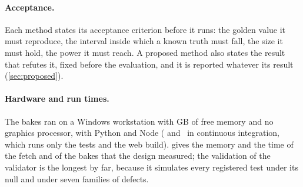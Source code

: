 \paragraph{Acceptance.} Each method states its acceptance criterion before it runs: the golden value it must reproduce, the interval inside which a known truth must fall, the size it must hold, the power it must reach. A proposed method also states the result that refutes it, fixed before the evaluation, and it is reported whatever its result (\cref{sec:proposed}).

\paragraph{Hardware and run times.} The bakes ran on a Windows workstation with \rsRamGb{} GB of free memory and no graphics processor, with Python \rsPythonDev{} and Node \rsNodeDev{} (\rsPythonCi{} and~\rsNodeCi{} in continuous integration, which runs only the tests and the web build).  gives the memory and the time of the fetch and of the bakes that the design measured; the validation of the validator is the longest by far, because it simulates every registered test under its null and under seven families of defects.


